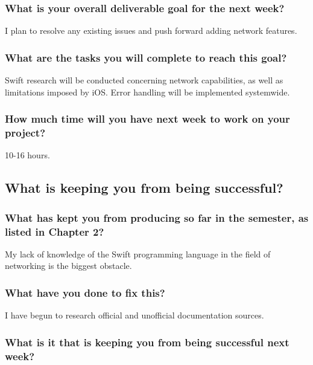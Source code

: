 \documentclass[letterpaper]{article}            %
\begin{document}
\subsubsection{What is your overall deliverable goal for the next week?}

I plan to resolve any existing issues and push forward adding network features.

\subsubsection{What are the tasks you will complete to reach this goal?}

Swift research will be conducted concerning network capabilities, as well as limitations imposed by iOS. Error handling will be implemented systemwide.

\subsubsection{How much time will you have next week to work on your project?}

10-16 hours.


\subsection{What is keeping you from being successful?}

\subsubsection{What has kept you from producing so far in the semester, as listed in Chapter 2?}

My lack of knowledge of the Swift programming language in the field of networking is the biggest obstacle.

\subsubsection{What have you done to fix this?}

I have begun to research official and unofficial documentation sources.

\subsubsection{What is it that is keeping you from being successful next week?}
\end{document}
